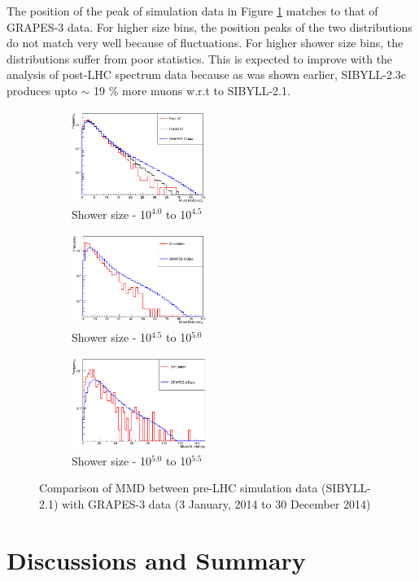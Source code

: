 \documentclass[12pt]{article}
\begin{document}
The position of the peak of simulation data in Figure \ref{fig:mmbin2} matches to that of GRAPES-3 data. For higher size bins, the position peaks of the two distributions do not match very well because of fluctuations. For higher shower size bins, the distributions suffer from poor statistics. This is expected to improve with the analysis of post-LHC spectrum data because as was shown earlier, SIBYLL-2.3c produces upto $\sim$ 19 \% more muons w.r.t to SIBYLL-2.1. 

\begin{figure}[h]
\begin{subfigure}{0.32\textwidth}
\includegraphics[width=0.9\linewidth, height=3cm]{mmbin2} 
\caption{Shower size - 10$^{4.0}$ to 10$^{4.5}$}
\label{fig:mmbin2}
\end{subfigure}
\begin{subfigure}{0.32\textwidth}
\includegraphics[width=0.9\linewidth, height=3cm]{mmbin3} 
\caption{Shower size - 10$^{4.5}$ to 10$^{5.0}$}
\label{fig:mmbin3}
\end{subfigure}
\begin{subfigure}{0.32\textwidth}
\includegraphics[width=0.9\linewidth, height = 3cm]{mmbin4} 
\caption{Shower size - 10$^{5.0}$ to 10$^{5.5}$}
\label{fig:mmbin4}
\end{subfigure}
\caption{Comparison of MMD between pre-LHC simulation data (SIBYLL-2.1) with GRAPES-3 data (3 January, 2014 to 30 December 2014)}
\label{fig:mmbin}
\end{figure}

\section{Discussions and Summary}
\end{document}
